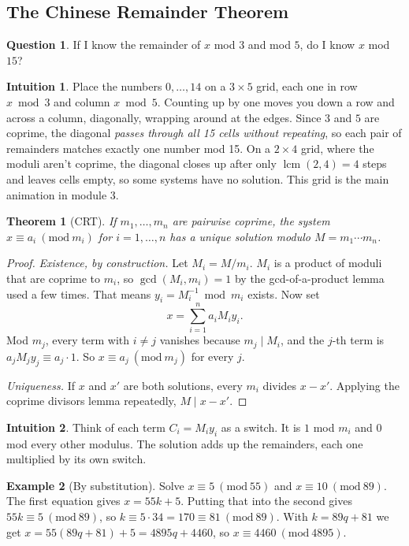 \documentclass[11pt,a4paper]{article}
\newtheorem{theorem}{Theorem}[section]
\theoremstyle{definition}
\newtheorem{example}[theorem]{Example}
\newcommand{\md}[1]{\ (\mathrm{mod}\ #1)}
\DeclareMathOperator{\lcm}{lcm}
\theoremstyle{noteit}
\newtheorem*{question}{Question}
\theoremstyle{note}
\newtheorem*{intuition}{Intuition}
\begin{document}
\subsection{The Chinese Remainder Theorem}

\begin{question}
If I know the remainder of $x$ mod $3$ and mod $5$, do I know $x$ mod $15$?
\end{question}

\begin{intuition}
Place the numbers $0,\dots,14$ on a $3\times5$ grid, each one in row $x\bmod3$ and column $x\bmod 5$. Counting up by one moves you down a row and across a column, diagonally, wrapping around at the edges. Since $3$ and $5$ are coprime, the diagonal \emph{passes through all 15 cells without repeating}, so each pair of remainders matches exactly one number mod 15. On a $2\times4$ grid, where the moduli aren't coprime, the diagonal closes up after only $\lcm(2,4)=4$ steps and leaves cells empty, so some systems have no solution. This grid is the main animation in module 3.
\end{intuition}

\begin{theorem}[CRT]
If $m_1,\dots,m_n$ are pairwise coprime, the system $x\equiv a_i\md{m_i}$ for $i=1,\dots,n$ has a unique solution modulo $M=m_1\cdots m_n$.
\end{theorem}

\begin{proof}
\emph{Existence, by construction.} Let $M_i=M/m_i$. $M_i$ is a product of moduli that are coprime to $m_i$, so $\gcd(M_i,m_i)=1$ by the gcd-of-a-product lemma used a few times. That means $y_i=M_i^{-1}\bmod m_i$ exists. Now set
\[ x=\sum_{i=1}^n a_iM_iy_i. \]
Mod $m_j$, every term with $i\ne j$ vanishes because $m_j\mid M_i$, and the $j$-th term is $a_jM_jy_j\equiv a_j\cdot1$. So $x\equiv a_j\md{m_j}$ for every $j$.

\emph{Uniqueness.} If $x$ and $x'$ are both solutions, every $m_i$ divides $x-x'$. Applying the coprime divisors lemma repeatedly, $M\mid x-x'$.
\end{proof}

\begin{intuition}
Think of each term $C_i=M_iy_i$ as a switch. It is $1$ mod $m_i$ and $0$ mod every other modulus. The solution adds up the remainders, each one multiplied by its own switch.
\end{intuition}

\begin{example}[By substitution]
Solve $x\equiv5\md{55}$ and $x\equiv10\md{89}$. The first equation gives $x=55k+5$. Putting that into the second gives $55k\equiv5\md{89}$, so $k\equiv5\cdot34=170\equiv81\md{89}$. With $k=89q+81$ we get $x=55(89q+81)+5=4895q+4460$, so $x\equiv4460\md{4895}$.
\end{example}
\end{document}
